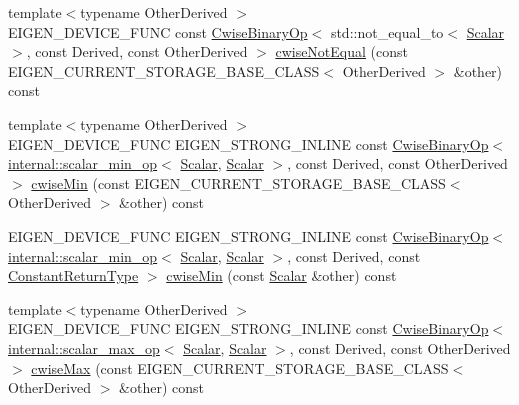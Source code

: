 \begin{DoxyCompactItemize}
\item 
{\footnotesize template$<$typename Other\+Derived $>$ }\\E\+I\+G\+E\+N\+\_\+\+D\+E\+V\+I\+C\+E\+\_\+\+F\+U\+NC const \mbox{\hyperlink{class_eigen_1_1_cwise_binary_op}{Cwise\+Binary\+Op}}$<$ std\+::not\+\_\+equal\+\_\+to$<$ \mbox{\hyperlink{class_eigen_1_1_dense_base_a5feed465b3a8e60c47e73ecce83e39a2}{Scalar}} $>$, const Derived, const Other\+Derived $>$ \mbox{\hyperlink{class_eigen_1_1_matrix_base_a78d22ea009bdb12a0988a1c2cb5252b2}{cwise\+Not\+Equal}} (const E\+I\+G\+E\+N\+\_\+\+C\+U\+R\+R\+E\+N\+T\+\_\+\+S\+T\+O\+R\+A\+G\+E\+\_\+\+B\+A\+S\+E\+\_\+\+C\+L\+A\+SS$<$ Other\+Derived $>$ \&other) const
\item 
{\footnotesize template$<$typename Other\+Derived $>$ }\\E\+I\+G\+E\+N\+\_\+\+D\+E\+V\+I\+C\+E\+\_\+\+F\+U\+NC E\+I\+G\+E\+N\+\_\+\+S\+T\+R\+O\+N\+G\+\_\+\+I\+N\+L\+I\+NE const \mbox{\hyperlink{class_eigen_1_1_cwise_binary_op}{Cwise\+Binary\+Op}}$<$ \mbox{\hyperlink{struct_eigen_1_1internal_1_1scalar__min__op}{internal\+::scalar\+\_\+min\+\_\+op}}$<$ \mbox{\hyperlink{class_eigen_1_1_dense_base_a5feed465b3a8e60c47e73ecce83e39a2}{Scalar}}, \mbox{\hyperlink{class_eigen_1_1_dense_base_a5feed465b3a8e60c47e73ecce83e39a2}{Scalar}} $>$, const Derived, const Other\+Derived $>$ \mbox{\hyperlink{class_eigen_1_1_matrix_base_a5b789cbaea429d83bc180422d452afda}{cwise\+Min}} (const E\+I\+G\+E\+N\+\_\+\+C\+U\+R\+R\+E\+N\+T\+\_\+\+S\+T\+O\+R\+A\+G\+E\+\_\+\+B\+A\+S\+E\+\_\+\+C\+L\+A\+SS$<$ Other\+Derived $>$ \&other) const
\item 
E\+I\+G\+E\+N\+\_\+\+D\+E\+V\+I\+C\+E\+\_\+\+F\+U\+NC E\+I\+G\+E\+N\+\_\+\+S\+T\+R\+O\+N\+G\+\_\+\+I\+N\+L\+I\+NE const \mbox{\hyperlink{class_eigen_1_1_cwise_binary_op}{Cwise\+Binary\+Op}}$<$ \mbox{\hyperlink{struct_eigen_1_1internal_1_1scalar__min__op}{internal\+::scalar\+\_\+min\+\_\+op}}$<$ \mbox{\hyperlink{class_eigen_1_1_dense_base_a5feed465b3a8e60c47e73ecce83e39a2}{Scalar}}, \mbox{\hyperlink{class_eigen_1_1_dense_base_a5feed465b3a8e60c47e73ecce83e39a2}{Scalar}} $>$, const Derived, const \mbox{\hyperlink{class_eigen_1_1_cwise_nullary_op}{Constant\+Return\+Type}} $>$ \mbox{\hyperlink{class_eigen_1_1_matrix_base_a1fe128db1212934573807865ec872dbd}{cwise\+Min}} (const \mbox{\hyperlink{class_eigen_1_1_dense_base_a5feed465b3a8e60c47e73ecce83e39a2}{Scalar}} \&other) const
\item 
{\footnotesize template$<$typename Other\+Derived $>$ }\\E\+I\+G\+E\+N\+\_\+\+D\+E\+V\+I\+C\+E\+\_\+\+F\+U\+NC E\+I\+G\+E\+N\+\_\+\+S\+T\+R\+O\+N\+G\+\_\+\+I\+N\+L\+I\+NE const \mbox{\hyperlink{class_eigen_1_1_cwise_binary_op}{Cwise\+Binary\+Op}}$<$ \mbox{\hyperlink{struct_eigen_1_1internal_1_1scalar__max__op}{internal\+::scalar\+\_\+max\+\_\+op}}$<$ \mbox{\hyperlink{class_eigen_1_1_dense_base_a5feed465b3a8e60c47e73ecce83e39a2}{Scalar}}, \mbox{\hyperlink{class_eigen_1_1_dense_base_a5feed465b3a8e60c47e73ecce83e39a2}{Scalar}} $>$, const Derived, const Other\+Derived $>$ \mbox{\hyperlink{class_eigen_1_1_matrix_base_aef908389c90ade88aafefd7e8f7b024e}{cwise\+Max}} (const E\+I\+G\+E\+N\+\_\+\+C\+U\+R\+R\+E\+N\+T\+\_\+\+S\+T\+O\+R\+A\+G\+E\+\_\+\+B\+A\+S\+E\+\_\+\+C\+L\+A\+SS$<$ Other\+Derived $>$ \&other) const

\end{DoxyCompactItemize}

